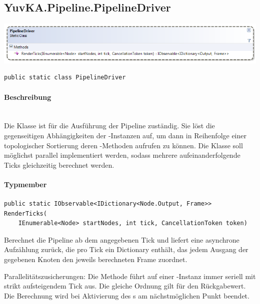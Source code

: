 \subsection{YuvKA.Pipeline.PipelineDriver}

\includegraphics[width=\textwidth]{YuvKA.Pipeline/driver.png}
\begin{verbatim}
public static class PipelineDriver
\end{verbatim}

\paragraph{Beschreibung}~\\
Die Klasse  ist für die Ausführung der Pipeline zuständig. Sie löst die gegenseitigen Abhängigkeiten der -Instanzen auf, um dann in Reihenfolge einer topologischer Sortierung deren -Methoden aufrufen zu können.
Die Klasse soll möglichst parallel implementiert werden, sodass mehrere aufeinanderfolgende Ticks gleichzeitig berechnet werden.

\paragraph{Typmember}
\begin{itemize}

	\begin{verbatim}
public static IObservable<IDictionary<Node.Output, Frame>> RenderTicks(
    IEnumerable<Node> startNodes, int tick, CancellationToken token)
    \end{verbatim}
	Berechnet die Pipeline ab dem angegebenen Tick und liefert eine asynchrone Aufzählung zurück, die pro Tick ein Dictionary enthält, das jedem Ausgang der gegebenen Knoten  den jeweils berechneten Frame zuordnet.

    Parallelitätszusicherungen: Die Methode führt auf einer -Instanz  immer seriell mit strikt aufsteigendem Tick aus. Die gleiche Ordnung gilt für den Rückgabewert. Die Berechnung wird bei Aktivierung des s am nächstmöglichen Punkt beendet.

\end{itemize}
